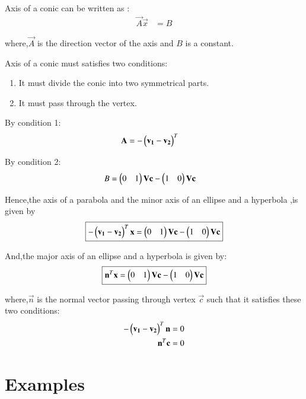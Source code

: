 \documentclass[journal,12pt,twocolumn]{IEEEtran}
\begin{document}
Axis of a conic can be written as :
\begin{align}
    \vec{A}\vec{x} &= B
\end{align}

where,$\vec{A}$ is the direction vector of the axis and $B$ is a constant.

Axis of a conic must satisfies two conditions:
\begin{enumerate}
    \item  It must divide the conic into two symmetrical parts. 
    \item  It must pass through the vertex.
\end{enumerate}

By condition 1:
\begin{align}
    \mathbf{A} &= -\begin{pmatrix}\mathbf{v_1}-\mathbf{v_2}\end{pmatrix}^T
\end{align}

By condition 2:
\begin{align}
    B &= \begin{pmatrix}0 & 1\end{pmatrix}\mathbf{V}\mathbf{c} - \begin{pmatrix}1 & 0\end{pmatrix}\mathbf{V}\mathbf{c}
\end{align}

Hence,the axis of a parabola and the minor axis of an ellipse and a hyperbola ,is given by
\begin{align}
    \boxed{-\begin{pmatrix}\mathbf{v_1}-\mathbf{v_2}\end{pmatrix}^T\mathbf{x} = \begin{pmatrix}0 & 1\end{pmatrix}\mathbf{V}\mathbf{c} - \begin{pmatrix}1 & 0\end{pmatrix}\mathbf{V}\mathbf{c}}
\end{align}

And,the major axis of an ellipse and a hyperbola is given by:
\begin{align}
     \boxed{\mathbf{n}^T\mathbf{x} = \begin{pmatrix}0 & 1\end{pmatrix}\mathbf{V}\mathbf{c} - \begin{pmatrix}1 & 0\end{pmatrix}\mathbf{V}\mathbf{c}}
\end{align}

where,$\vec{n}$ is the normal vector passing through vertex $\vec{c}$ such that it satisfies these two conditions:
\begin{align}
    -\begin{pmatrix}\mathbf{v_1} - \mathbf{v_2}\end{pmatrix}^T\mathbf{n} = 0 
    \\
    \mathbf{n}^T\mathbf{c} = 0
\end{align}

\section{Examples}
\end{document}
